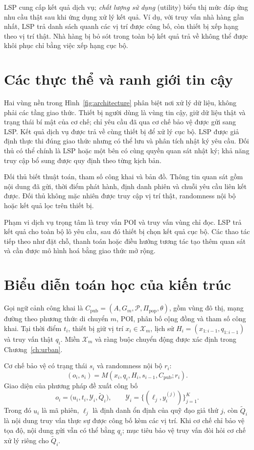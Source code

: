 \documentclass[12pt,a4paper,oneside]{report}
\begin{document}
LSP cung cấp kết quả dịch vụ; \emph{chất lượng sử dụng} (utility) biểu thị mức đáp ứng nhu cầu thật sau khi ứng dụng xử lý kết quả. Ví dụ, với truy vấn nhà hàng gần nhất, LSP trả danh sách quanh các vị trí được công bố, còn thiết bị xếp hạng theo vị trí thật. Nhà hàng bị bỏ sót trong toàn bộ kết quả trả về không thể được khôi phục chỉ bằng việc xếp hạng cục bộ.

\section{Các thực thể và ranh giới tin cậy}

Hai vùng nền trong Hình~\ref{fig:architecture} phân biệt nơi xử lý dữ liệu, không phải các tầng giao thức. Thiết bị người dùng là vùng tin cậy, giữ dữ liệu thật và trạng thái bí mật của cơ chế; chỉ yêu cầu đã qua cơ chế bảo vệ được gửi sang LSP. Kết quả dịch vụ được trả về cùng thiết bị để xử lý cục bộ. LSP được giả định thực thi đúng giao thức nhưng có thể lưu và phân tích nhật ký yêu cầu. Đối thủ có thể chính là LSP hoặc một bên có cùng quyền quan sát nhật ký; khả năng truy cập bổ sung được quy định theo từng kịch bản.

Đối thủ biết thuật toán, tham số công khai và bản đồ. Thông tin quan sát gồm nội dung đã gửi, thời điểm phát hành, định danh phiên và chuỗi yêu cầu liên kết được. Đối thủ không mặc nhiên được truy cập vị trí thật, randomness nội bộ hoặc kết quả lọc trên thiết bị.

Phạm vi dịch vụ trọng tâm là truy vấn POI và truy vấn vùng chỉ đọc. LSP trả kết quả cho toàn bộ lô yêu cầu, sau đó thiết bị chọn kết quả cục bộ. Các thao tác tiếp theo như đặt chỗ, thanh toán hoặc điều hướng tương tác tạo thêm quan sát và cần được mô hình hoá bằng giao thức mở rộng.

\section{Biểu diễn toán học của kiến trúc}

Gọi ngữ cảnh công khai là $C_{\mathrm{pub}}=(A,G_m,\mathcal P,\Pi_{\mathrm{pop}},\theta)$, gồm vùng đô thị, mạng đường theo phương thức di chuyển $m$, POI, phân bố cộng đồng và tham số công khai. Tại thời điểm $t_i$, thiết bị giữ vị trí $x_i\in\mathcal X_m$, lịch sử $H_i=(x_{1:i-1},q_{1:i-1})$ và truy vấn thật $q_i$. Miền $\mathcal X_m$ và ràng buộc chuyển động được xác định trong Chương~\ref{ch:urban}.

Cơ chế bảo vệ có trạng thái $s_i$ và randomness nội bộ $r_i$:
\[
(o_i,s_i)=M(x_i,q_i,H_i,s_{i-1},C_{\mathrm{pub}};r_i).
\]
Giao diện của phương pháp đề xuất công bố
\[
o_i=\bigl(u_i,t_i,\mathcal Y_i,\widetilde Q_i\bigr),\qquad
\mathcal Y_i=\{(\ell_j,y_i^{(j)})\}_{j=1}^{K}.
\]
Trong đó $u_i$ là mã phiên, $\ell_j$ là định danh ổn định của quỹ đạo giả thứ $j$, còn $\widetilde Q_i$ là nội dung truy vấn thực sự được công bố kèm các vị trí. Khi cơ chế chỉ bảo vệ tọa độ, nội dung gửi vẫn có thể bằng $q_i$; mục tiêu bảo vệ truy vấn đòi hỏi cơ chế xử lý riêng cho $\widetilde Q_i$.
\end{document}
